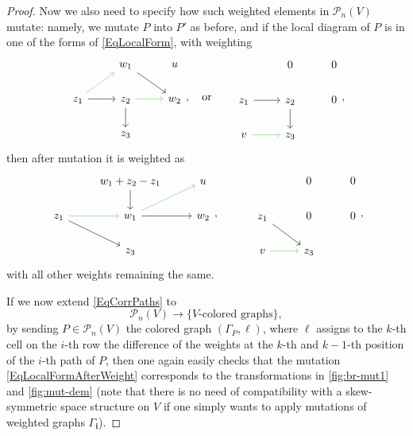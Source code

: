 \documentclass[11pt, reqno]{amsart}
\theoremstyle{definition}
\numberwithin{equation}{section}
\newcommand{\mbi}{\mathbf{i}}
\newcommand{\msP}{\mathscr{P}}
\begin{document}
\begin{proof}
Now we also need to specify how such weighted elements in $\msP_n(V)$ mutate: namely, we mutate $P$ into $P'$ as before, and if the local diagram of $P$ is in one of the forms of \eqref{EqLocalForm}, with weighting 
\begin{equation}\label{EqLocalFormWeight}
\begin{tikzcd}
	& w_1 & u \\
	z_1 & z_2 & w_2 \\
	 & z_3
	\arrow[from=1-2, to=2-3]
	\arrow[color={rgb,255:red,92;green,214;blue,92}, from=2-1, to=1-2]
	\arrow[from=2-1, to=2-2]
	\arrow[color={rgb,255:red,92;green,214;blue,92}, from=2-2, to=2-3]
	\arrow[from=2-2, to=3-2]
\end{tikzcd},\quad \textrm{or}\qquad 
\begin{tikzcd}
	& {0} & {0} \\
	z_1 & z_2 & {0} \\
	{v} & z_3
	\arrow[from=2-1, to=2-2]
	\arrow[from=2-2, to=3-2]
\arrow[color={rgb,255:red,92;green,214;blue,92}, from=3-1, to=3-2]
\end{tikzcd},
\end{equation}
then after mutation it is weighted as
\begin{equation}\label{EqLocalFormAfterWeight}
\begin{tikzcd}
	& {w_1 +z_2 -z_1} & {u} \\
	z_1 & w_1 & {w_2} \\
	 & z_3
	\arrow[from=1-2, to=2-2]
	\arrow[color={rgb,255:red,92;green,214;blue,92}, from=2-1, to=2-2]
	\arrow[from=2-2, to=2-3]
    \arrow[color={rgb,255:red,92;green,214;blue,92}, from=2-2, to=1-3]
	\arrow[from=2-1, to=3-2]
\end{tikzcd},\quad \textrm{}\qquad 
\begin{tikzcd}
	& {0} & {0} \\
	z_1 & 0 & {0} \\
	{v} & z_3
	\arrow[from=2-1, to=3-2]
\arrow[color={rgb,255:red,92;green,214;blue,92}, from=3-1, to=3-2]
\end{tikzcd},
\end{equation}
with all other weights remaining the same.

If we now extend \eqref{EqCorrPaths} to 
\begin{equation}\label{EqMapTocomplete}
\msP_n(V) \rightarrow \{V\textrm{-colored graphs}\},
\end{equation}
by sending $P\in \msP_n(V)$ the colored graph $(\Gamma_P,\ell)$, where $\ell$ assigns to the $k$-th cell on the $i$-th row the difference of the weights at the $k$-th and $k-1$-th position of the $i$-th path of $P$, then one again easily checks that the mutation \eqref{EqLocalFormAfterWeight} corresponds to the transformations in \eqref{fig:br-mut1} and \eqref{fig:mut-dem} (note that there is no need of compatibility with a skew-symmetric space structure on $V$ if one simply wants to apply mutations of weighted graphs $\Gamma_{\mbi}$). 


\end{proof}
\end{document}
